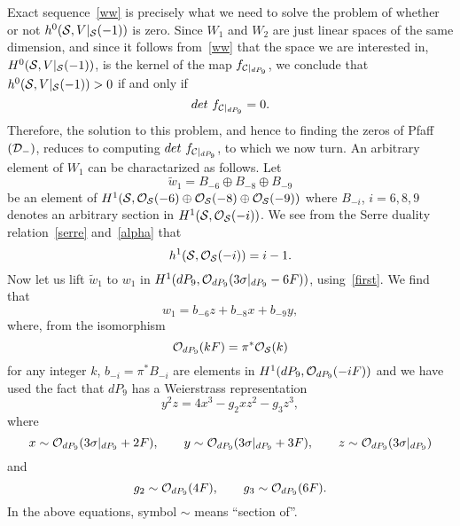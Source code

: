 \documentclass[a4paper,12pt]{article}
\numberwithin{equation}{section}
\theoremstyle{plain}
\begin{document}
Exact sequence~\eqref{ww} is precisely what we need to solve the problem
of whether or not $h^{0}({\cal S}, V|_{{\cal S}}(-1))$ is zero.
Since $W_1$ and $W_2$ are just linear spaces of the same dimension, and
since
it follows from~\eqref{ww}
that the space we are interested in, $H^{0}({\cal S}, V|_{{\cal S}}(-1))$,
is the kernel of the map $f_{{\cal{C}}|_{dP_{9}}}$, we conclude that
$h^{0}({\cal S}, V|_{{\cal S}}(-1))>0$ if and only if
%
\begin{equation}
det{\ }f_{{\cal{C}}|_{dP_{9}}} =0.
\label{58}
\end{equation}
%
Therefore, the solution to this problem, and hence to
finding the zeros of Pfaff$({\cal D}_{-})$,
reduces
to computing $det{\ }f_{{\cal{C}}|_{dP_{9}}}$, to which we now turn.
An arbitrary element of $W_1$ can be charactarized as follows. Let
%
\begin{equation}
\tilde{w}_1 =  B_{-6} \oplus B_{-8} \oplus B_{-9}
\label{59}
\end{equation}
%
be an element of $H^{1} ({\cal S}, {\cal O}_{{\cal S}} (-6) \oplus
{\cal O}_{{\cal S}} (-8) \oplus {\cal O}_{{\cal S}} (-9))$ where
$B_{ -i}$, $i=6, 8, 9$ denotes an arbitrary section in
$H^{1}({\cal S}, {\cal O}_{\cal S}(-i))$. We see from the Serre duality
relation~\eqref{serre} and~\eqref{alpha} that
%
\begin{equation}
h^{1}({\cal S}, {\cal O}_{\cal S}(-i)) = i-1.
\label{dim}
\end{equation}
%
Now let us lift $\tilde{w}_1$ to $w_1$ in
$H^{1} (dP_9, {\cal O}_{dP_9} (3 \sigma|_{dP_9}-6F))$,
using~\eqref{first}.
We find that
%
\begin{equation}
w_{1} = b_{-6} z + b_{-8} x + b_{-9} y,
\label{lift}
\end{equation}
%
where, from the isomorphism
%
\begin{equation}
{\cal O}_{dP_9} (kF) = \pi^{*} {\cal O}_{{\cal S}} (k)
\label{60}
\end{equation}
%
for any integer $k$,
$b_{-i}=\pi^{*}B_{-i}$ are elements in
$H^{1}(dP_9, {\cal O}_{dP_{9}}(-iF))$ and we have used the fact
that $dP_9$ has a Weierstrass representation
%
\begin{equation}
y^2 z=4 x^3 - g_2 x z^2 - g_3 z^3,
\label{61}
\end{equation}
%
where~\cite{BDOold}
%
\begin{equation}
x \sim {\cal O}_{dP_9} (3 \sigma|_{dP_9} +2F), \qquad
y \sim {\cal O}_{dP_9} (3 \sigma|_{dP_9} +3F), \qquad
z \sim {\cal O}_{dP_9} (3 \sigma|_{dP_9})
\label{coord}
\end{equation}
%
and
%
\begin{equation}
g_2 \sim {\cal O}_{dP_9} (4F), \qquad g_3 \sim {\cal O}_{dP_9} (6F).
\label{coord2}
\end{equation}
In the above equations, symbol $\sim$ means ``section of''.
\end{document}
